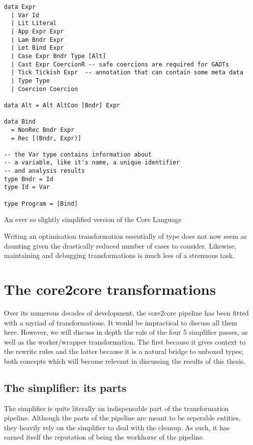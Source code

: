\begin{listing}[H]
\begin{verbatim}
data Expr
  | Var Id
  | Lit Literal
  | App Expr Expr
  | Lam Bndr Expr
  | Let Bind Expr
  | Case Expr Bndr Type [Alt]
  | Cast Expr CoercionR -- safe coercions are required for GADTs
  | Tick Tickish Expr  -- annotation that can contain some meta data
  | Type Type
  | Coercion Coercion
  
data Alt = Alt AltCon [Bndr] Expr
 
data Bind
  = NonRec Bndr Expr
  = Rec [(Bndr, Expr)]
  
-- the Var type contains information about
-- a variable, like it's name, a unique identifier
-- and analysis results
type Bndr = Id
type Id = Var

type Program = [Bind]
\end{verbatim}
\label{code:core_def}
\caption{An ever so slightly simplified version of the Core Language}
\end{listing}

Writing an optimisation transformation essentially of type  does not now seem
as daunting given the drastically reduced number of cases to consider. 
Likewise, maintaining and debugging transformations is much less of a strenuous task.

\section{The core2core transformations}

Over its numerous decades of development, the core2core pipeline has been fitted with a myriad of transformations.
It would be impractical to discuss all them here. However, we will discuss in depth the role of the four 5 simplifier
passes, as well as the worker/wrapper transformation. The first because it gives context to the rewrite rules and the latter
because it is a natural bridge to unboxed types; both concepts which will become relevant in discussing the results of this thesis.

\subsection{The simplifier: its parts}

The simplifier is quite literally an indispensable part of the transformation pipeline. Although the parts of the pipeline
are meant to be seperable entities, they heavily rely on the simplifier to deal with the cleanup. As such, it has earned
itself the reputation of being the workhorse of the pipeline. \cite{ghc_wiki}

